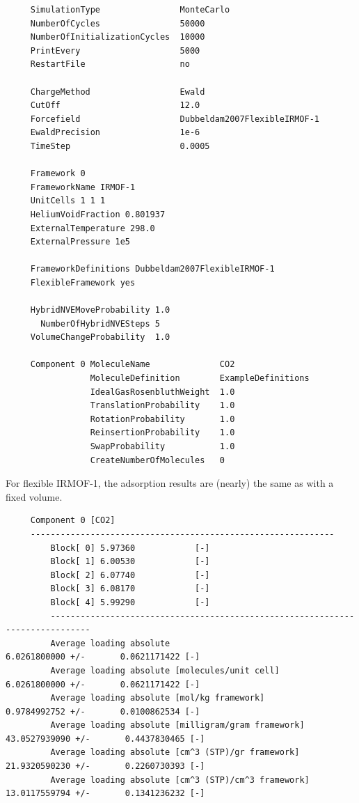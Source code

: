 \begin{tiny}
\begin{verbatim}
     SimulationType                MonteCarlo
     NumberOfCycles                50000
     NumberOfInitializationCycles  10000
     PrintEvery                    5000
     RestartFile                   no
     
     ChargeMethod                  Ewald
     CutOff                        12.0
     Forcefield                    Dubbeldam2007FlexibleIRMOF-1
     EwaldPrecision                1e-6
     TimeStep                      0.0005
     
     Framework 0
     FrameworkName IRMOF-1
     UnitCells 1 1 1
     HeliumVoidFraction 0.801937
     ExternalTemperature 298.0
     ExternalPressure 1e5
     
     FrameworkDefinitions Dubbeldam2007FlexibleIRMOF-1
     FlexibleFramework yes
     
     HybridNVEMoveProbability 1.0
       NumberOfHybridNVESteps 5
     VolumeChangeProbability  1.0
     
     Component 0 MoleculeName              CO2
                 MoleculeDefinition        ExampleDefinitions
                 IdealGasRosenbluthWeight  1.0
                 TranslationProbability    1.0
                 RotationProbability       1.0
                 ReinsertionProbability    1.0
                 SwapProbability           1.0
                 CreateNumberOfMolecules   0
\end{verbatim}
\end{tiny}

\noindent
For flexible IRMOF-1, the adsorption results are (nearly) the same as with a fixed volume.
\begin{tiny}
\begin{verbatim}
     Component 0 [CO2]
     -------------------------------------------------------------
         Block[ 0] 5.97360            [-]
         Block[ 1] 6.00530            [-]
         Block[ 2] 6.07740            [-]
         Block[ 3] 6.08170            [-]
         Block[ 4] 5.99290            [-]
         ------------------------------------------------------------------------------
         Average loading absolute                              6.0261800000 +/-       0.0621171422 [-]
         Average loading absolute [molecules/unit cell]        6.0261800000 +/-       0.0621171422 [-]
         Average loading absolute [mol/kg framework]                  0.9784992752 +/-       0.0100862534 [-]
         Average loading absolute [milligram/gram framework]         43.0527939090 +/-       0.4437830465 [-]
         Average loading absolute [cm^3 (STP)/gr framework]          21.9320590230 +/-       0.2260730393 [-]
         Average loading absolute [cm^3 (STP)/cm^3 framework]        13.0117559794 +/-       0.1341236232 [-]
\end{verbatim}
\end{tiny}

